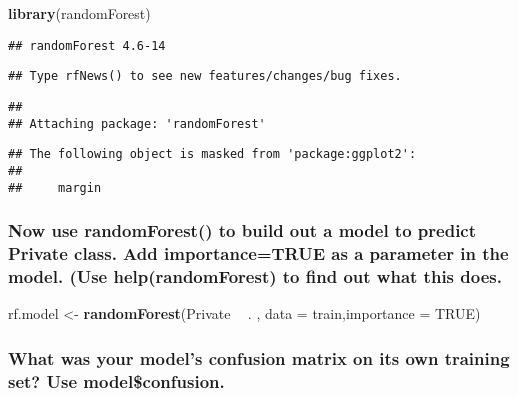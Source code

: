 \documentclass[]{article}
\newenvironment{Shaded}{\begin{snugshade}}{\end{snugshade}}
\newcommand{\DataTypeTok}[1]{\textcolor[rgb]{0.13,0.29,0.53}{#1}}
\newcommand{\KeywordTok}[1]{\textcolor[rgb]{0.13,0.29,0.53}{\textbf{#1}}}
\newcommand{\NormalTok}[1]{#1}
\newcommand{\OperatorTok}[1]{\textcolor[rgb]{0.81,0.36,0.00}{\textbf{#1}}}
\newcommand{\OtherTok}[1]{\textcolor[rgb]{0.56,0.35,0.01}{#1}}
\newcommand{\StringTok}[1]{\textcolor[rgb]{0.31,0.60,0.02}{#1}}
\begin{document}
\begin{Shaded}
\begin{Highlighting}[]
\KeywordTok{library}\NormalTok{(randomForest)}
\end{Highlighting}
\end{Shaded}

\begin{verbatim}
## randomForest 4.6-14
\end{verbatim}

\begin{verbatim}
## Type rfNews() to see new features/changes/bug fixes.
\end{verbatim}

\begin{verbatim}
## 
## Attaching package: 'randomForest'
\end{verbatim}

\begin{verbatim}
## The following object is masked from 'package:ggplot2':
## 
##     margin
\end{verbatim}

\hypertarget{now-use-randomforest-to-build-out-a-model-to-predict-private-class.-add-importancetrue-as-a-parameter-in-the-model.-use-helprandomforest-to-find-out-what-this-does.}{%
\subsubsection{Now use randomForest() to build out a model to predict
Private class. Add importance=TRUE as a parameter in the model. (Use
help(randomForest) to find out what this
does.}\label{now-use-randomforest-to-build-out-a-model-to-predict-private-class.-add-importancetrue-as-a-parameter-in-the-model.-use-helprandomforest-to-find-out-what-this-does.}}

\begin{Shaded}
\begin{Highlighting}[]
\NormalTok{rf.model <-}\StringTok{ }\KeywordTok{randomForest}\NormalTok{(Private }\OperatorTok{~}\StringTok{ }\NormalTok{. , }\DataTypeTok{data =}\NormalTok{ train,}\DataTypeTok{importance =} \OtherTok{TRUE}\NormalTok{)}
\end{Highlighting}
\end{Shaded}

\hypertarget{what-was-your-models-confusion-matrix-on-its-own-training-set-use-modelconfusion.}{%
\subsubsection{What was your model's confusion matrix on its own
training set? Use
model\$confusion.}\label{what-was-your-models-confusion-matrix-on-its-own-training-set-use-modelconfusion.}}
\end{document}
